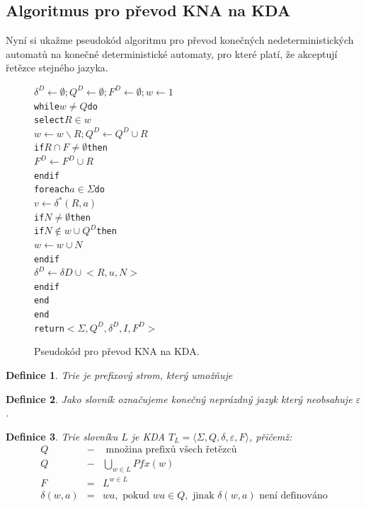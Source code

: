 \documentclass[10pt, a4paper, titlepage]{article}
\theoremstyle{note}
\newtheorem{definice}{\textbf{Definice}}
\begin{document}
\subsection{Algoritmus pro převod KNA na KDA}
Nyní si ukažme pseudokód algoritmu pro převod konečných nedeterministických automatů na konečné deterministické automaty, pro které platí, že
akceptují řetězce stejného jazyka.

\vspace{30px}
\begin{figure}[h]
\begin{alltt}
\( \delta^{D} \leftarrow \emptyset; Q^{D} \leftarrow \emptyset; F^{D} \leftarrow \emptyset; w \leftarrow {1} \)
while \( w \neq Q \) do
     select \( R \in w \)
     \( w \leftarrow w \smallsetminus {R}; Q^{D} \leftarrow Q^{D} \cup {R} \)
     if \( R \cap F \neq \emptyset \) then
         \( F^{D} \leftarrow F^{D} \cup {R} \)
     endif
     foreach \( a \in \Sigma \) do
         \( v \leftarrow \delta^{*}(R, a) \)
         if \( N \neq \emptyset \) then
             if \( N \notin w \cup Q^{D} \) then
                 \( w \leftarrow w \cup {N} \)
             endif
             \( \delta^{D} \leftarrow \delta{D} \cup {<R, u, N>} \)
         endif
     end
end
return \( <\Sigma, Q^{D}, \delta^{D}, I, F^{D}> \)
\end{alltt}
\caption{Pseudokód pro převod KNA na KDA.}
\end{figure}


\begin{definice}
\emph{Trie} je prefixový strom, který umožňuje 
\end{definice}

\begin{definice}
Jako \emph{slovník} označujeme konečný neprázdný jazyk který neobsahuje $\varepsilon$.
\end{definice}

\begin{definice}
Trie slovníku $L$ je KDA $T_{L} = \langle \Sigma, Q, \delta, \varepsilon, F \rangle$, přičemž:
\begin{eqnarray*}
Q &-& \text{ množina prefixů všech řetězců} \\
Q &-& \bigcup_{w \in L} Pfx(w) \\
F &=& L^{w \in L} \\
\delta(w,a) &=& wa, \text{ pokud } wa \in Q, \text{ jinak } \delta(w,a) \text{ není definováno}
\end{eqnarray*}
\end{definice}
\end{document}
